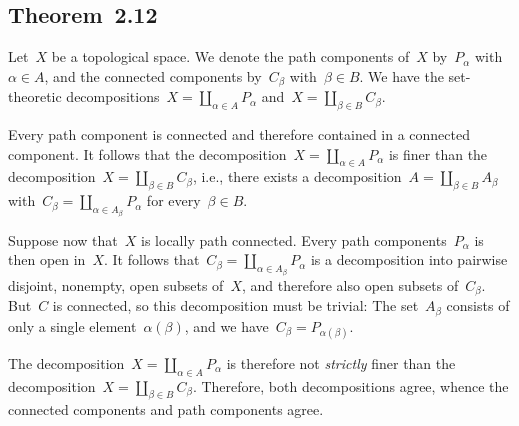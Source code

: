 \subsection{Theorem~2.12}

Let~$X$ be a topological space.
We denote the path components of~$X$ by~$P_α$ with~$α ∈ A$, and the connected components by~$C_β$ with~$β ∈ B$.
We have the set-theoretic decompositions~$X = ∐_{α ∈ A} P_α$ and~$X = ∐_{β ∈ B} C_β$.

Every path component is connected and therefore contained in a connected component.
It follows that the decomposition~$X = ∐_{α ∈ A} P_α$ is finer than the decomposition~$X = ∐_{β ∈ B} C_β$, i.e., there exists a decomposition~$A = ∐_{β ∈ B} A_β$ with~$C_β = ∐_{α ∈ A_β} P_α$ for every~$β ∈ B$.

Suppose now that~$X$ is locally path connected.
Every path components~$P_α$ is then open in~$X$.
It follows that~$C_β = ∐_{α ∈ A_β} P_α$ is a decomposition into pairwise disjoint, nonempty, open subsets of~$X$, and therefore also open subsets of~$C_β$.
But~$C$ is connected, so this decomposition must be trivial:
The set~$A_β$ consists of only a single element~$α(β)$, and we have~$C_β = P_{α(β)}$.

The decomposition~$X = ∐_{α ∈ A} P_α$ is therefore not \emph{strictly} finer than the decomposition~$X = ∐_{β ∈ B} C_β$.
Therefore, both decompositions agree, whence the connected components and path components agree.
